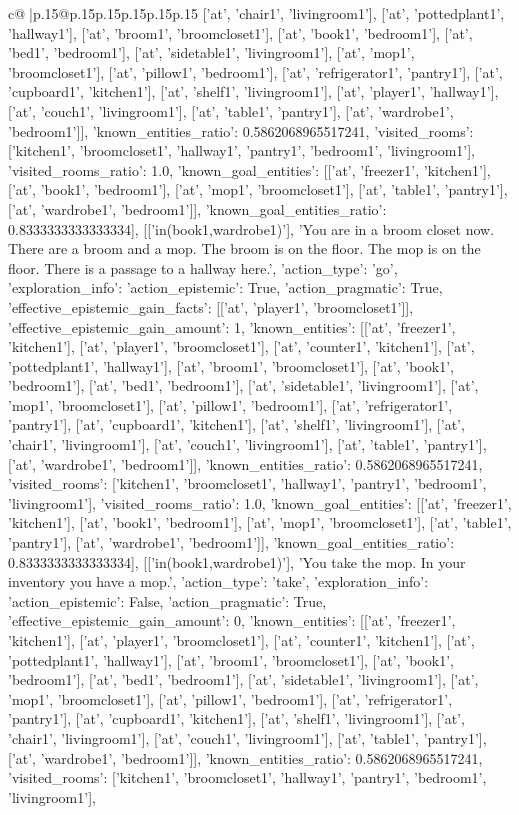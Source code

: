 \documentclass{article}
\begin{document}
{\begin{supertabular}{c@{$\;$}|p{.15\linewidth}@{}p{.15\linewidth}p{.15\linewidth}p{.15\linewidth}p{.15\linewidth}p{.15\linewidth}}
{{{['at', 'chair1', 'livingroom1'], ['at', 'pottedplant1', 'hallway1'], ['at', 'broom1', 'broomcloset1'], ['at', 'book1', 'bedroom1'], ['at', 'bed1', 'bedroom1'], ['at', 'sidetable1', 'livingroom1'], ['at', 'mop1', 'broomcloset1'], ['at', 'pillow1', 'bedroom1'], ['at', 'refrigerator1', 'pantry1'], ['at', 'cupboard1', 'kitchen1'], ['at', 'shelf1', 'livingroom1'], ['at', 'player1', 'hallway1'], ['at', 'couch1', 'livingroom1'], ['at', 'table1', 'pantry1'], ['at', 'wardrobe1', 'bedroom1']], 'known_entities_ratio': 0.5862068965517241, 'visited_rooms': ['kitchen1', 'broomcloset1', 'hallway1', 'pantry1', 'bedroom1', 'livingroom1'], 'visited_rooms_ratio': 1.0, 'known_goal_entities': [['at', 'freezer1', 'kitchen1'], ['at', 'book1', 'bedroom1'], ['at', 'mop1', 'broomcloset1'], ['at', 'table1', 'pantry1'], ['at', 'wardrobe1', 'bedroom1']], 'known_goal_entities_ratio': 0.8333333333333334}}], [['in(book1,wardrobe1)'], 'You are in a broom closet now. There are a broom and a mop. The broom is on the floor. The mop is on the floor. There is a passage to a hallway here.', {'action_type': 'go', 'exploration_info': {'action_epistemic': True, 'action_pragmatic': True, 'effective_epistemic_gain_facts': [['at', 'player1', 'broomcloset1']], 'effective_epistemic_gain_amount': 1, 'known_entities': [['at', 'freezer1', 'kitchen1'], ['at', 'player1', 'broomcloset1'], ['at', 'counter1', 'kitchen1'], ['at', 'pottedplant1', 'hallway1'], ['at', 'broom1', 'broomcloset1'], ['at', 'book1', 'bedroom1'], ['at', 'bed1', 'bedroom1'], ['at', 'sidetable1', 'livingroom1'], ['at', 'mop1', 'broomcloset1'], ['at', 'pillow1', 'bedroom1'], ['at', 'refrigerator1', 'pantry1'], ['at', 'cupboard1', 'kitchen1'], ['at', 'shelf1', 'livingroom1'], ['at', 'chair1', 'livingroom1'], ['at', 'couch1', 'livingroom1'], ['at', 'table1', 'pantry1'], ['at', 'wardrobe1', 'bedroom1']], 'known_entities_ratio': 0.5862068965517241, 'visited_rooms': ['kitchen1', 'broomcloset1', 'hallway1', 'pantry1', 'bedroom1', 'livingroom1'], 'visited_rooms_ratio': 1.0, 'known_goal_entities': [['at', 'freezer1', 'kitchen1'], ['at', 'book1', 'bedroom1'], ['at', 'mop1', 'broomcloset1'], ['at', 'table1', 'pantry1'], ['at', 'wardrobe1', 'bedroom1']], 'known_goal_entities_ratio': 0.8333333333333334}}], [['in(book1,wardrobe1)'], 'You take the mop. In your inventory you have a mop.', {'action_type': 'take', 'exploration_info': {'action_epistemic': False, 'action_pragmatic': True, 'effective_epistemic_gain_amount': 0, 'known_entities': [['at', 'freezer1', 'kitchen1'], ['at', 'player1', 'broomcloset1'], ['at', 'counter1', 'kitchen1'], ['at', 'pottedplant1', 'hallway1'], ['at', 'broom1', 'broomcloset1'], ['at', 'book1', 'bedroom1'], ['at', 'bed1', 'bedroom1'], ['at', 'sidetable1', 'livingroom1'], ['at', 'mop1', 'broomcloset1'], ['at', 'pillow1', 'bedroom1'], ['at', 'refrigerator1', 'pantry1'], ['at', 'cupboard1', 'kitchen1'], ['at', 'shelf1', 'livingroom1'], ['at', 'chair1', 'livingroom1'], ['at', 'couch1', 'livingroom1'], ['at', 'table1', 'pantry1'], ['at', 'wardrobe1', 'bedroom1']], 'known_entities_ratio': 0.5862068965517241, 'visited_rooms': ['kitchen1', 'broomcloset1', 'hallway1', 'pantry1', 'bedroom1', 'livingroom1'], }}}
\end{supertabular}}
\end{document}
